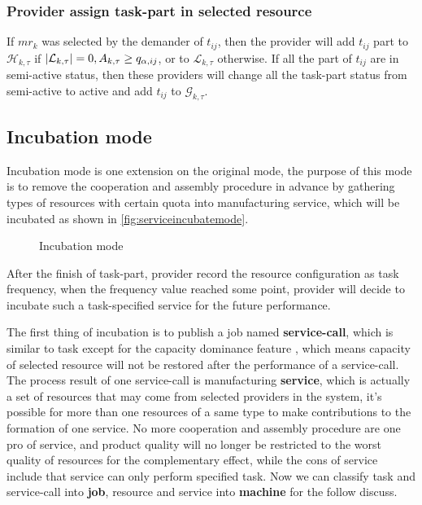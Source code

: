 \subsubsection{Provider assign task-part in selected resource} %
\label{subs:assign_in_select_resource}
If $mr_k$ was selected by the demander of $t_{ij}$, then the provider will add $t_{ij}$ part to $\mathcal{H}_{k,\tau}$ if $\left|\mathcal{L}_{k,\tau}\right|=0,A_{k,\tau}\ge q_{\alpha,ij}$, or to  $\mathcal{L}_{k,\tau}$ otherwise.
If all the part of $t_{ij}$ are in semi-active status, then these providers will change all the task-part status from semi-active to active and add $t_{ij}$ to $\mathcal{G}_{k,\tau}$.

\subsection{Incubation mode} %
\label{sub:incubation_mode}
Incubation mode is one extension on the original mode, the purpose of this mode is to remove the cooperation and assembly procedure in advance by gathering types of resources with certain quota into manufacturing service, which will be incubated as shown in \autoref{fig:serviceincubatemode}.
\begin{figure}[htbp]
    \centering
    \resizebox{0.7\textwidth}{!}{}
    \caption{Incubation mode}
    \label{fig:serviceincubatemode}
\end{figure}
After the finish of task-part, provider record the resource configuration as task frequency, when the frequency value reached some point, provider will decide to incubate such a task-specified service for the future performance.

The first thing of incubation is to publish a job named \textbf{service-call}, which is similar to task except for the capacity dominance feature , which means capacity of selected resource will not be restored after the performance of a service-call. The process result of one service-call is manufacturing \textbf{service}, which is actually a set of resources that may come from selected providers in the system, it's possible for more than one resources of a same type to make contributions to the formation of one service. No more cooperation and assembly procedure are one pro of service, and product quality will no longer be restricted to the worst quality of resources for the complementary effect, while the cons of service include that service can only perform specified task.
Now we can classify task and service-call into \textbf{job}, resource and service into \textbf{machine} for the follow discuss.


